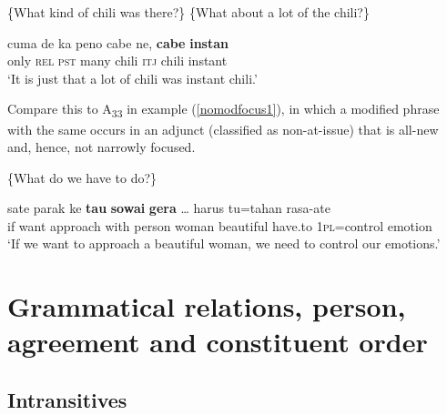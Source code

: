\documentclass[output=paper
,modfonts
,nonflat]{langsci/langscibook}
\begin{document}
\begin{exe}
	\ex\label{modfocus1}
	\begin{xlist}
		 \{What kind of chili was there?\}
		 \{What about a lot of the chili?\}
	\end{xlist}
	\begin{xlist}[≫ A\textsubscript{{8.1}}:]
		\exi{≫ A\textsubscript{{8.1}}:}
		\gll cuma {{\ob}de} ka {{\ob}peno{\cb}\ctopic} cabe ne, \textbf{cabe} {{\ob}\textbf{instan}{\cb}\focus{\cb}\sq}\\
		only \hphantom{[}\textsc{rel} \textsc{pst} many chili \textsc{itj} chili \hphantom{[}instant\\
		\glt `It is just that a lot of chili was instant chili.'
	\end{xlist}
\end{exe}

\noindent Compare this to  A\textsubscript{{33}} in example (\ref{nomodfocus1}), in which a modified phrase with the same  occurs in an adjunct  (classified as non-at-issue) that is all-new and, hence, not narrowly focused.

\begin{exe}
	\ex\label{nomodfocus1}
	\begin{xlist}
			\{What do we have to do?\}
	\end{xlist}
	\begin{xlist}[> A\textsubscript{{33'}}:]
		\exi{> A\textsubscript{{33'}}:}
		 sate parak ke \textbf{tau} \textbf{sowai} {\textbf{gera}{\cb}\nai} {{\ob}\dots{\cb}} {{\ob}harus} {{\ob}tu=tahan} {rasa-ate{\cb}\focus{\cb}\sq}\\
		\hphantom{[}if want approach with person woman beautiful {} \hphantom{[}have.to \hphantom{[}\textsc{1pl}=control emotion\\
		\glt `If we want to approach a beautiful woman, we need to control our emotions.'
	\end{xlist}
\end{exe}

\section{Grammatical relations, person, agreement and constituent order}\label{sect:clitic}
\subsection{Intransitives}
\end{document}
